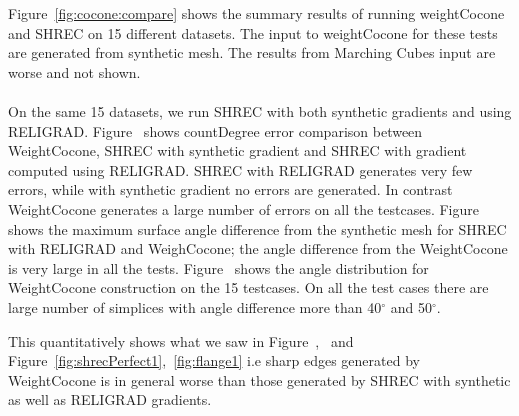 Figure~\ref{fig:cocone:compare} shows the summary results of running weightCocone and SHREC on 15 different datasets. 
The input to weightCocone  for these tests are generated from synthetic mesh. The results from Marching Cubes input are worse and not shown.
\paragraph{}
On the same 15 datasets, we run SHREC with both synthetic gradients and using RELIGRAD.
Figure~\protect{} shows countDegree error comparison between WeightCocone, SHREC with synthetic gradient and SHREC with gradient computed using RELIGRAD.  SHREC with RELIGRAD generates very few errors, while with synthetic gradient no errors are generated. 
In contrast WeightCocone generates a large number of errors on all the testcases. Figure~\protect{} shows the maximum surface angle difference from the synthetic mesh for SHREC with RELIGRAD and WeighCocone; the angle difference from the WeightCocone is very large in all the tests. Figure~\protect{} shows the angle distribution for WeightCocone construction on the 15 testcases. 
On all the test cases there are large number of simplices with angle difference more than 40$^\circ$ and 50$^\circ$.

This quantitatively shows what we saw in Figure~\protect{},~\protect{} and Figure~\ref{fig:shrecPerfect1},~\ref{fig:flange1} i.e sharp edges generated by WeightCocone is in general worse than those generated by SHREC with synthetic as well as RELIGRAD gradients. 

